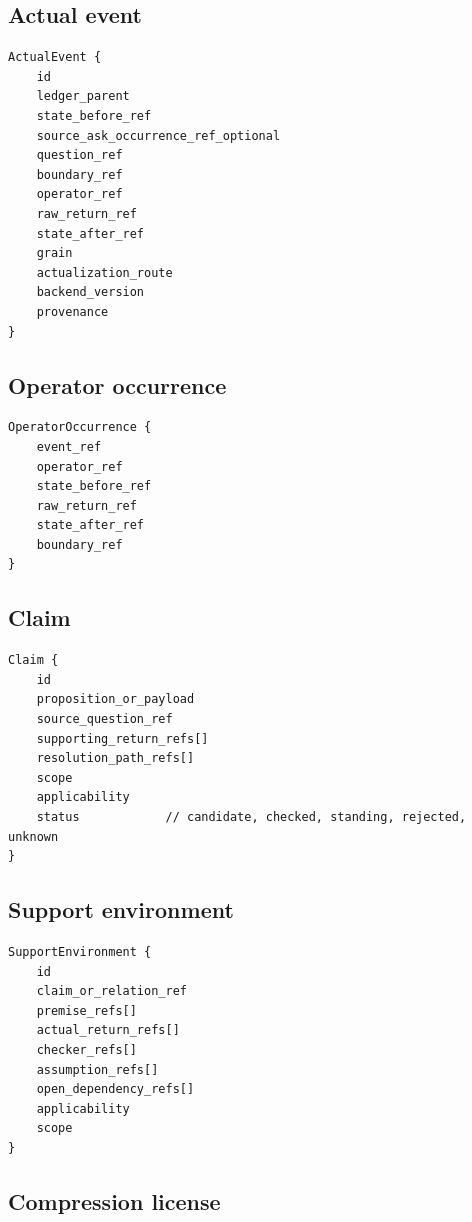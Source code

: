 \documentclass[11pt,oneside]{article}
\begin{document}
\subsection{Actual event}

\begin{lstlisting}[basicstyle=\ttfamily\small]
ActualEvent {
    id
    ledger_parent
    state_before_ref
    source_ask_occurrence_ref_optional
    question_ref
    boundary_ref
    operator_ref
    raw_return_ref
    state_after_ref
    grain
    actualization_route
    backend_version
    provenance
}
\end{lstlisting}

\subsection{Operator occurrence}

\begin{lstlisting}[basicstyle=\ttfamily\small]
OperatorOccurrence {
    event_ref
    operator_ref
    state_before_ref
    raw_return_ref
    state_after_ref
    boundary_ref
}
\end{lstlisting}

\subsection{Claim}

\begin{lstlisting}[basicstyle=\ttfamily\small]
Claim {
    id
    proposition_or_payload
    source_question_ref
    supporting_return_refs[]
    resolution_path_refs[]
    scope
    applicability
    status            // candidate, checked, standing, rejected, unknown
}
\end{lstlisting}

\subsection{Support environment}

\begin{lstlisting}[basicstyle=\ttfamily\small]
SupportEnvironment {
    id
    claim_or_relation_ref
    premise_refs[]
    actual_return_refs[]
    checker_refs[]
    assumption_refs[]
    open_dependency_refs[]
    applicability
    scope
}
\end{lstlisting}

\subsection{Compression license}
\end{document}
